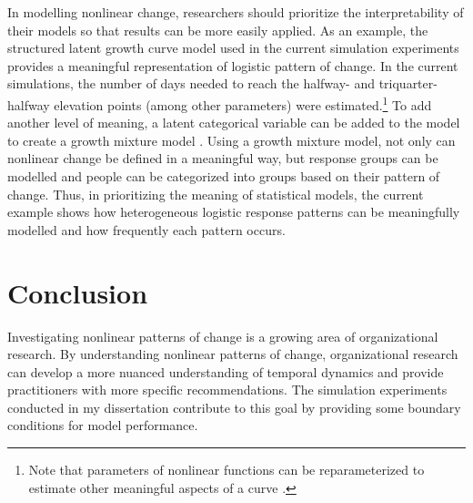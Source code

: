 \documentclass[
12pt, %
twoside,
english]{guelphthesis}
\renewcommand{\theapp}{\Alph{app}} %
\begin{document}
In modelling nonlinear change, researchers should prioritize the interpretability of their models so that results can be more easily applied. As an example, the structured latent growth curve model used in the current simulation experiments provides a meaningful representation of logistic pattern of change. In the current simulations, the number of days needed to reach the halfway- and triquarter-halfway elevation points (among other parameters) were estimated.\footnote{Note that parameters of nonlinear functions can be reparameterized to estimate other meaningful aspects of a curve \parencite{preacher2015}.} To add another level of meaning, a latent categorical variable can be added to the model to create a growth mixture model \autocite{vandernest2020}. Using a growth mixture model, not only can nonlinear change be defined in a meaningful way, but response groups can be modelled and people can be categorized into groups based on their pattern of change. Thus, in prioritizing the meaning of statistical models, the current example shows how heterogeneous logistic response patterns can be meaningfully modelled and how frequently each pattern occurs.

\hypertarget{conclusion}{%
\section{Conclusion}\label{conclusion}}

Investigating nonlinear patterns of change is a growing area of organizational research. By understanding nonlinear patterns of change, organizational research can develop a more nuanced understanding of temporal dynamics and provide practitioners with more specific recommendations. The simulation experiments conducted in my dissertation contribute to this goal by providing some boundary conditions for model performance.

\newpage
\renewcommand\bibname{References}
{}
\printbibliography

\renewcommand\thefigure{\theapp.\arabic{figure}} %

\renewcommand\thetable{\theapp.\arabic{table}} %
\end{document}
